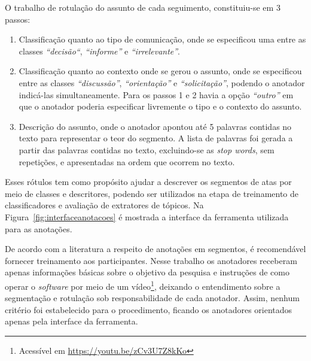 O trabalho de rotulação do assunto de cada seguimento, constituiu-se em 3 passos:
\begin{enumerate}
	\item 

Classificação quanto ao tipo de comunicação, onde se especificou uma entre as classes 
\textit{``decisão``},
\textit{``informe''} e 
\textit{``irrelevante''}. 
	\item 
Classificação quanto ao contexto onde se gerou o assunto, onde se especificou entre as classes 
\textit{``discussão''},
\textit{``orientação''} e	
\textit{``solicitação''}, podendo o anotador indicá-las simultaneamente.
Para os passos 1 e 2 havia a opção \textit{``outro''} em que o anotador poderia especificar livremente o tipo e o contexto do assunto.
	\item 
		Descrição do assunto, onde o anotador apontou até 5 palavras contidas no texto para representar o teor do segmento. A lista de palavras foi gerada a partir das palavras contidas no texto, excluindo-se as \textit{stop words}, sem repetições, e apresentadas na ordem que ocorrem no texto.
\end{enumerate}
Esses rótulos tem como propósito ajudar a descrever os segmentos de atas por meio de classes e descritores, podendo ser utilizados na etapa de treinamento de classificadores e avaliação de extratores de tópicos.
Na Figura~\ref{fig:interfaceanotacoes} é mostrada a interface da ferramenta utilizada para as anotações.









De acordo com a literatura a respeito de anotações em segmentos, é recomendável fornecer treinamento aos participantes. Nesse trabalho os anotadores receberam apenas informações básicas sobre o objetivo da pesquisa e instruções de como operar o \textit{software} por meio de um vídeo\footnote{Acessível em \url{https://youtu.be/zCv3U7Z8kKo}}, deixando o entendimento sobre a segmentação e rotulação sob responsabilidade de cada anotador. Assim, nenhum critério foi estabelecido para o procedimento, ficando os anotadores orientados apenas pela interface da ferramenta. 

